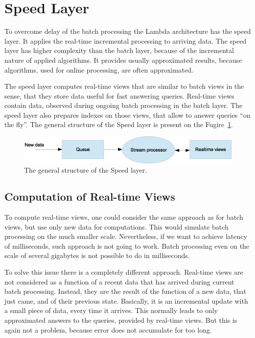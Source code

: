 \section{Speed Layer}
\label{sec:speed_layer}

To overcome delay of the batch processing the Lambda architecture has the speed layer.
It applies the real-time incremental processing to arriving data.
The speed layer has higher complexity than the batch layer, because of the incremental nature of applied algorithms.
It provides usually approximated results, because algorithms, used for online processing, are often approximated.

The speed layer computes real-time views that are similar to batch views in the sense, that they store data useful for fast answering queries.
Real-time views contain data, observed during ongoing batch processing in the batch layer.
The speed layer also prepares indexes on those views, that allow to answer queries ``on the fly''.
The general structure of the Speed layer is present on the Fugire~\ref{fig:SpeedLayer}.

\begin{figure}[h]
  \centering
  \includegraphics [width=1.0\textwidth]{images/SpeedLayer}
  \caption{The general structure of the Speed layer.}
  \label{fig:SpeedLayer}
\end{figure}

\subsection{Computation of Real-time Views}

To compute real-time views, one could consider the same approach as for batch views, but use only new data for computations.
This would simulate batch processing on the much smaller scale.
Nevertheless, if we want to achieve latency of milliseconds, such approach is not going to work.
Batch processing even on the scale of several gigabytes is not possible to do in milliseconds.

To solve this issue there is a completely different approach.
Real-time views are not considered as a function of a recent data that has arrived during current batch processing.
Instead, they are the result of the function of a new data, that just came, and of their previous state.
Basically, it is an incremental update with a small piece of data, every time it arrives.
This normally leads to only approximated answers to the queries, provided by real-time views.
But this is again not a problem, because error does not accumulate for too long.

